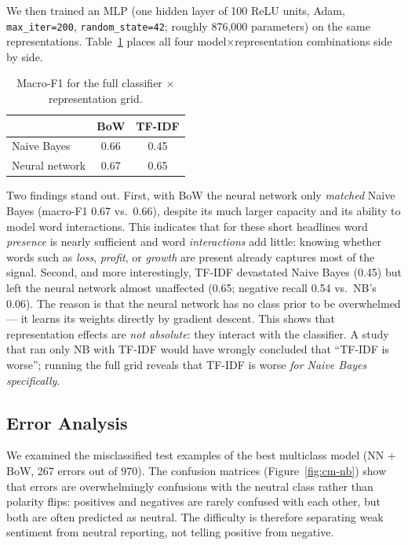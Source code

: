 We then trained an MLP (one hidden layer of 100 ReLU units, Adam,
\texttt{max\_iter=200}, \texttt{random\_state=42}; roughly 876{,}000
parameters) on the same representations. Table~\ref{tab:grid} places all
four model$\times$representation combinations side by side.

\begin{table}[t]
\centering
\caption{Macro-F1 for the full classifier $\times$ representation grid.}
\label{tab:grid}
\begin{tabular}{lcc}
\toprule
 & BoW & TF-IDF \\
\midrule
Naive Bayes      & 0.66 & 0.45 \\
Neural network   & 0.67 & 0.65 \\
\bottomrule
\end{tabular}
\end{table}

Two findings stand out. First, with BoW the neural network only
\emph{matched} Naive Bayes (macro-F1 0.67 vs.\ 0.66), despite its much
larger capacity and its ability to model word interactions. This
indicates that for these short headlines word \emph{presence} is nearly
sufficient and word \emph{interactions} add little: knowing whether
words such as \textit{loss}, \textit{profit}, or \textit{growth} are
present already captures most of the signal. Second, and more
interestingly, TF-IDF devastated Naive Bayes (0.45) but left the neural
network almost unaffected (0.65; negative recall 0.54 vs.\ NB's 0.06).
The reason is that the neural network has no class prior to be
overwhelmed --- it learns its weights directly by gradient descent. This
shows that representation effects are \emph{not absolute}: they interact
with the classifier. A study that ran only NB with TF-IDF would have
wrongly concluded that ``TF-IDF is worse''; running the full grid
reveals that TF-IDF is worse \emph{for Naive Bayes specifically}.

\subsection{Error Analysis}

We examined the misclassified test examples of the best multiclass model
(NN + BoW, 267 errors out of 970). The confusion matrices
(Figure~\ref{fig:cm-nb}) show that errors are overwhelmingly
confusions with the neutral class rather than polarity flips: positives
and negatives are rarely confused with each other, but both are often
predicted as neutral. The difficulty is therefore separating weak
sentiment from neutral reporting, not telling positive from negative.


